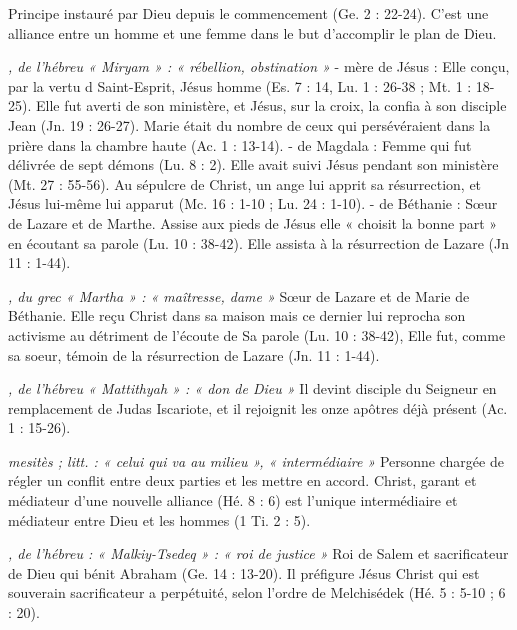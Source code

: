 \begin{multicols}{2}
\textit{}\newline
Principe instauré par Dieu depuis le commencement (Ge. 2 : 22-24). C'est une alliance entre un homme et une femme dans le but d'accomplir le plan de Dieu.

\textit{, de l'hébreu « Miryam » : « rébellion, obstination »}\newline
- mère de Jésus : Elle conçu, par la vertu d Saint-Esprit, Jésus homme (Es. 7 : 14, Lu. 1 : 26-38 ; Mt. 1 : 18-25). Elle fut averti de son ministère, et Jésus, sur la croix, la confia à son disciple Jean (Jn. 19 : 26-27). Marie était du nombre de ceux qui persévéraient dans la prière dans la chambre haute (Ac. 1 : 13-14).
- de Magdala : Femme qui fut délivrée de sept démons (Lu. 8 : 2). Elle avait suivi Jésus pendant son ministère (Mt. 27 : 55-56). Au sépulcre de Christ, un ange lui apprit sa résurrection, et Jésus lui-même lui apparut (Mc. 16 : 1-10 ; Lu. 24 : 1-10).
- de Béthanie : Sœur de Lazare et de Marthe. Assise aux pieds de Jésus elle « choisit la bonne part » en écoutant sa parole (Lu. 10 : 38-42). Elle assista à la résurrection de Lazare (Jn 11 : 1-44).

\textit{, du grec « Martha » : « maîtresse, dame »}\newline
Sœur de Lazare et de Marie de Béthanie. Elle reçu Christ dans sa maison mais ce dernier lui reprocha son activisme au détriment de l'écoute de Sa parole (Lu. 10 : 38-42), Elle fut, comme sa soeur, témoin de la résurrection de Lazare (Jn. 11 : 1-44).

\textit{, de l'hébreu « Mattithyah » : « don de Dieu »}\newline
Il devint disciple du Seigneur en remplacement de Judas Iscariote, et il rejoignit les onze apôtres déjà présent (Ac. 1 : 15-26).

\textit{mesitès ; litt. : « celui qui va au milieu », « intermédiaire »}\newline
Personne chargée de régler un conflit entre deux parties et les mettre en accord.
Christ, garant et médiateur d'une nouvelle alliance (Hé. 8 : 6) est l'unique intermédiaire et médiateur entre Dieu et les hommes (1 Ti. 2 : 5).

\textit{, de l'hébreu : « Malkiy-Tsedeq » : « roi de justice »}\newline
Roi de Salem et sacrificateur de Dieu qui bénit Abraham (Ge. 14 : 13-20). Il préfigure Jésus Christ qui est souverain sacrificateur a perpétuité, selon l'ordre de Melchisédek (Hé. 5 : 5-10 ; 6 : 20).


\end{multicols}

